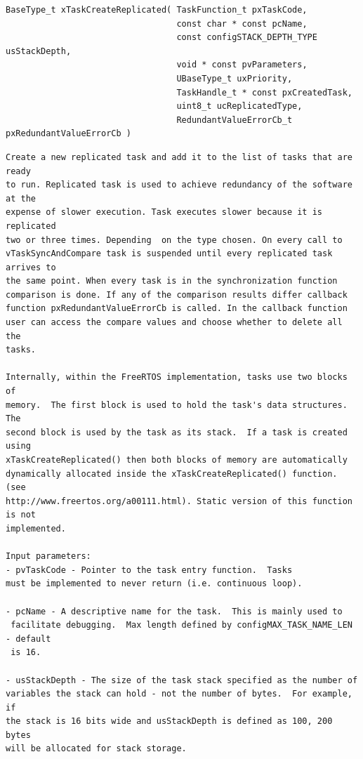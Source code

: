 \begin{verbatim}
BaseType_t xTaskCreateReplicated( TaskFunction_t pxTaskCode,
                                  const char * const pcName,
                                  const configSTACK_DEPTH_TYPE usStackDepth,
                                  void * const pvParameters,
                                  UBaseType_t uxPriority,
                                  TaskHandle_t * const pxCreatedTask,
                                  uint8_t ucReplicatedType,
                                  RedundantValueErrorCb_t pxRedundantValueErrorCb )
\end{verbatim}

\begin{lstlisting}
Create a new replicated task and add it to the list of tasks that are ready
to run. Replicated task is used to achieve redundancy of the software at the
expense of slower execution. Task executes slower because it is replicated
two or three times. Depending  on the type chosen. On every call to
vTaskSyncAndCompare task is suspended until every replicated task arrives to
the same point. When every task is in the synchronization function
comparison is done. If any of the comparison results differ callback
function pxRedundantValueErrorCb is called. In the callback function
user can access the compare values and choose whether to delete all the
tasks.

Internally, within the FreeRTOS implementation, tasks use two blocks of
memory.  The first block is used to hold the task's data structures.  The
second block is used by the task as its stack.  If a task is created using
xTaskCreateReplicated() then both blocks of memory are automatically
dynamically allocated inside the xTaskCreateReplicated() function.  (see
http://www.freertos.org/a00111.html). Static version of this function is not
implemented.

Input parameters:
- pvTaskCode - Pointer to the task entry function.  Tasks
must be implemented to never return (i.e. continuous loop).

- pcName - A descriptive name for the task.  This is mainly used to
 facilitate debugging.  Max length defined by configMAX_TASK_NAME_LEN - default
 is 16.

- usStackDepth - The size of the task stack specified as the number of
variables the stack can hold - not the number of bytes.  For example, if
the stack is 16 bits wide and usStackDepth is defined as 100, 200 bytes
will be allocated for stack storage.


\end{lstlisting}
